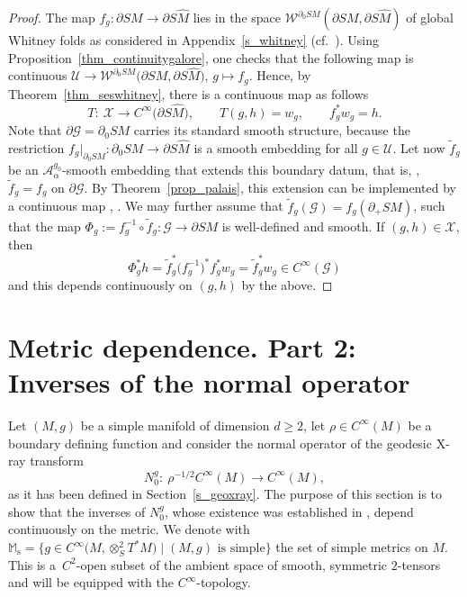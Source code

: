 \documentclass[pdftex]{sigma}
\numberwithin{equation}{section}
\theoremstyle{definition}
\newcommand{\M}{\mathbb{M}}
\newcommand{\Ms}{\M_{\mathrm{s}}}
\newcommand{\1}{{\bf 1}}
\begin{document}
\begin{proof}
	The map $f_g\colon \partial SM\to \partial S\hat M$ lies in the space $\mathcal W^{\partial_0SM}(\partial SM,\partial S\hat M)$ of global Whitney folds as considered in Appendix~\ref{s_whitney} (cf.~\cite[Section~5.2]{PSU23}). Using Proposition~\ref{thm_continuitygalore}, one checks that the following map is continuous $\mathcal U \to \mathcal W^{\partial_0SM}\bigl(\partial SM, \partial S\hat M\bigr)$, $ g\mapsto f_g$.
Hence, by Theorem~\ref{thm_seswhitney}, there is a continuous map as follows
\[
T\colon\ \mathcal X \to 	C^\infty\bigl(\partial S\hat M\bigr),\qquad T(g,h) = w_g,\qquad f_g^*w_g =h.
\]
\sloppy Note that $\partial \mathcal G = \partial_0SM$ carries its standard smooth structure, because the restriction $f_g|_{\partial_0SM} \colon \partial_0SM\to \partial S\hat M$ is a smooth embedding for all $g\in \mathcal U$. Let now $\tilde f_g$ be an $\mathcal A_\alpha^{g_0}$-smooth embedding that extends this boundary datum, that is,
, $ \tilde f_ g= f_g$ on $ \partial \mathcal G$.
By Theorem~\ref{prop_palais}, this extension can be implemented by a continuous map
, .
We may further assume that $\tilde f_g(\mathcal G) = f_g(\partial_+SM)$, such that the map
$
	\Phi_g:= f^{-1}_g\circ \tilde f_g\colon \mathcal G\to \partial SM
$ is well-defined and smooth. If $(g,h)\in \mathcal X$, then
\[
	\Phi_g^*h = \tilde f_g^* \bigl(f_g^{-1}\bigr)^* f_g^* w_g = \tilde f_g^* w_g \in C^\infty(\mathcal G)
\]
and this depends continuously on $(g,h)$ by the above.
\end{proof}

\section{Metric dependence. Part 2: Inverses of the normal operator} \label{s_verstappen}

Let $(M,g)$ be a simple manifold of dimension $d\ge 2$, let $\rho\in C^\infty(M)$ be a boundary defining function and consider the normal operator of the geodesic X-ray transform
\begin{equation*}
N^g_0 \colon\ \rho^{-1/2}C^\infty(M)\rightarrow C^\infty(M),
\end{equation*}
as it has been defined in Section~\ref{s_geoxray}. The purpose of this section is to show that the inverses of $N_0^g$, whose existence was established in \cite{MNP19a}, depend continuously on the metric. We denote with
$
\Ms=\big\{g\in C^\infty\bigl(M,\otimes^2_ST^*M\bigr)\mid (M,g)\text{ is simple}\big\}
$
the set of simple metrics on $M$. This is a~$C^2$-open subset of the ambient space of smooth, symmetric $2$-tensors and will be equipped with the $C^\infty$-topology.
\end{document}
